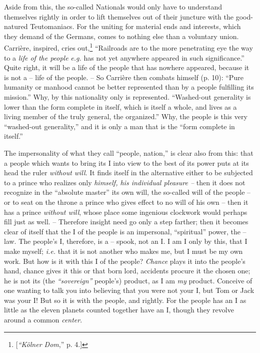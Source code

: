 \documentclass[12pt,a4paper]{book}
\begin{document}
Aside from this, the so-called Nationals would only have to understand 
themselves rightly in order to lift themselves out of their juncture with the 
good-natured Teutomaniacs. For the uniting for material ends and interests, 
which they demand of the Germans, comes to nothing else than a voluntary 
union. Carri\`ere, inspired, cries out,\footnote{[\textit{``K\"olner Dom},'' 
p. 4.]} ``Railroads are to the more penetrating eye the way to a \textit{life 
of the people} \textit{e.g.} has not yet anywhere appeared in such 
significance.'' Quite right, it will be a life of the people that has nowhere 
appeared, because it is not a -- life of the people. -- So Carri\`ere then 
combats himself (p. 10): ``Pure humanity or manhood cannot be better 
represented than by a people fulfilling its mission.'' Why, by this 
nationality only is represented. ``Washed-out generality is lower than the 
form complete in itself, which is itself a whole, and lives as a living member 
of the truly general, the organized.'' Why, the people is this very 
``washed-out generality,'' and it is only a man that is the ``form complete 
in itself.''

The impersonality of what they call ``people, nation,'' is clear also from 
this: that a people which wants to bring its I into view to the best of its 
power puts at its head the ruler \textit{without will}. It finds itself in the 
alternative either to be subjected to a prince who realizes only 
\textit{himself, his individual pleasure --} then it does not recognize in the 
``absolute master'' its own will, the so-called will of the people -- or to 
seat on the throne a prince who gives effect to no will of his own -- then it 
has a prince \textit{without will}, whose place some ingenious clockwork would 
perhaps fill just as well. -- Therefore insight need go only a step farther; 
then it becomes clear of itself that the I of the people is an impersonal, 
``spiritual'' power, the -- law. The people's I, therefore, is a -- spook, 
not an I. I am I only by this, that I make myself; \textit{i.e.} that it is 
not another who makes me, but I must be my own work. But how is it with this I 
of the people? \textit{Chance} plays it into the people's hand, chance gives 
it this or that born lord, accidents procure it the chosen one; he is not its 
(the \textit{``sovereign''} people's) product, as I am \textit{my} product. 
Conceive of one wanting to talk you into believing that you were not your I, 
but Tom or Jack was your I! But so it is with the people, and rightly. For the 
people has an I as little as the eleven planets counted together have an I, 
though they revolve around a common \textit{center}.
\end{document}

